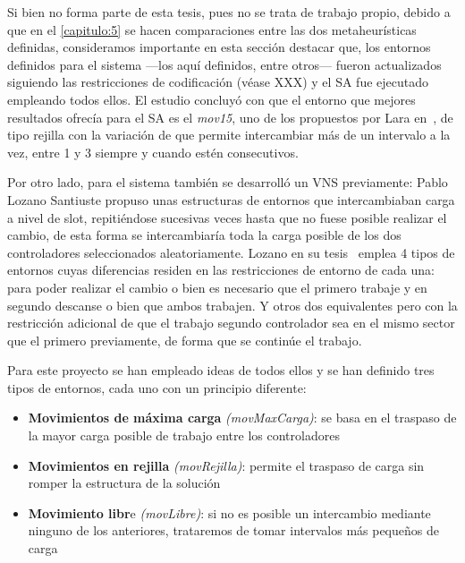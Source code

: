 Si bien no forma parte de esta tesis, pues no se trata de trabajo propio, debido a que en el \autoref{capitulo:5} se hacen comparaciones entre las dos metaheurísticas definidas, consideramos importante en esta sección destacar que, los entornos definidos para el sistema \legacy{} ---los aquí definidos, entre otros--- fueron actualizados siguiendo las restricciones de codificación (véase XXX) %
y el \gls{SA} fue ejecutado empleando todos ellos. El estudio concluyó con que el entorno que mejores resultados ofrecía para el SA es el \textit{mov15}, uno de los propuestos por Lara en~\cite{tesis-jonatan}, de tipo rejilla con la variación de que permite intercambiar más de un intervalo a la vez, entre 1 y 3 siempre y cuando estén consecutivos.

Por otro lado, para el sistema \legacy{} también se desarrolló un VNS previamente: Pablo Lozano Santiuste propuso unas estructuras de entornos que intercambiaban carga a nivel de slot, repitiéndose sucesivas veces hasta que no fuese posible realizar el cambio, de esta forma se intercambiaría toda la carga posible de los dos controladores seleccionados aleatoriamente. Lozano en su tesis~\cite{tesis-pablo} emplea 4 tipos de entornos cuyas diferencias residen en las restricciones de entorno de cada una: para poder realizar el cambio o bien es necesario que el primero trabaje y en segundo descanse o bien que ambos trabajen. Y otros dos equivalentes pero con la restricción adicional de que el trabajo segundo controlador sea en el mismo sector que el primero previamente, de forma que se continúe el trabajo.


Para este proyecto se han empleado ideas de todos ellos y se han definido tres tipos de entornos, cada uno con un principio diferente:
\begin{itemize}
	\item \textbf{Movimientos de máxima carga} \textit{(movMaxCarga)}: se basa en el traspaso de la mayor carga posible de trabajo entre los controladores
	
	\item \textbf{Movimientos en rejilla} \textit{(movRejilla)}: permite el traspaso de carga sin romper la estructura de la solución
			
	\item \textbf{Movimiento libr}e \textit{(movLibre)}: si no es posible un intercambio mediante ninguno de los anteriores, trataremos de tomar intervalos más pequeños de carga
\end{itemize}

